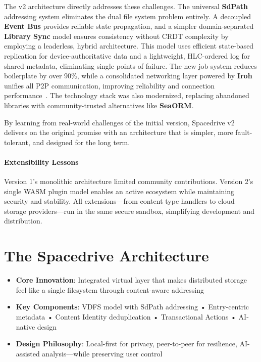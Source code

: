 \documentclass[sigconf]{acmart}
\begin{document}
The v2 architecture directly addresses these challenges. The universal \textbf{SdPath} addressing system eliminates the dual file system problem entirely. A decoupled \textbf{Event Bus} provides reliable state propagation, and a simpler domain-separated \textbf{Library Sync} model ensures consistency without CRDT complexity by employing a leaderless, hybrid architecture. This model uses efficient state-based replication for device-authoritative data and a lightweight, HLC-ordered log for shared metadata, eliminating single points of failure. The new job system reduces boilerplate by over 90\%, while a consolidated networking layer powered by \textbf{Iroh} unifies all P2P communication, improving reliability and connection performance~\cite{iroh_networking}. The technology stack was also modernized, replacing abandoned libraries with community-trusted alternatives like \textbf{SeaORM}.

By learning from real-world challenges of the initial version, Spacedrive v2 delivers on the original promise with an architecture that is simpler, more fault-tolerant, and designed for the long term.

\paragraph{Extensibility Lessons}
Version 1's monolithic architecture limited community contributions. Version 2's single WASM plugin model enables an active ecosystem while maintaining security and stability. All extensions—from content type handlers to cloud storage providers—run in the same secure sandbox, simplifying development and distribution.


\section{The Spacedrive Architecture}
\label{sec:architecture}

\begin{keytakeaways}
\begin{itemize}[noitemsep, topsep=0pt]
\item \textbf{Core Innovation}: Integrated virtual layer that makes distributed storage feel like a single filesystem through content-aware addressing
\item \textbf{Key Components}: VDFS model with SdPath addressing • Entry-centric metadata • Content Identity deduplication • Transactional Actions • AI-native design
\item \textbf{Design Philosophy}: Local-first for privacy, peer-to-peer for resilience, AI-assisted analysis---while preserving user control
\end{itemize}
\end{keytakeaways}
\end{document}
